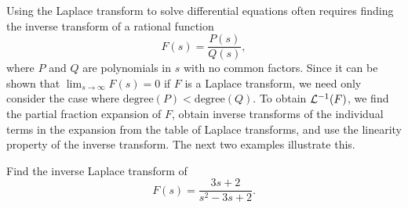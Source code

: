 
Using the Laplace transform to
 solve differential equations
often requires  finding the inverse
transform of a rational function
\[
F(s)=\frac{P(s)}{Q(s)},
\]
where $P$ and $Q$ are polynomials in $s$ with no common factors. Since
it can be shown that $\lim_{s\to\infty}F(s)=0$ if $F$ is a Laplace
transform, we need only consider the case where
$\mathrm{degree}(P)<\mathrm{degree}(Q)$. To obtain ${\mathcal L}^{-1}(F)$, we
find the partial fraction expansion of $F$, obtain inverse transforms
of the individual terms in the expansion from the table of Laplace
transforms, and use the linearity property of the inverse transform.
The next two examples illustrate this.

\begin{example}\label{example:8.2.4}
Find the inverse Laplace transform of
\begin{equation}\label{eq:8.2.1}
F(s)=\frac{3s+2}{s^2-3s+2}.
\end{equation}
\end{example}

